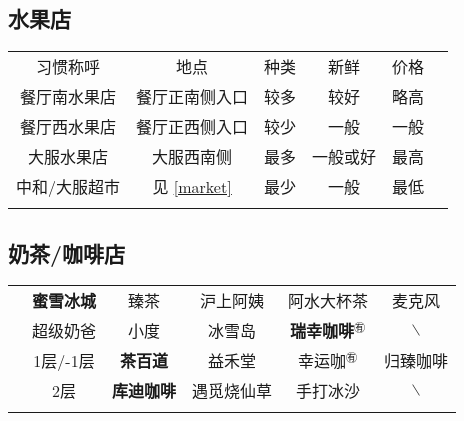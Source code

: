 \subsection[水果店]{水果店}
\begin{table}[H]
    \centering
    \begin{tabular}{|c|c|c|c|c|c|}
        \Xhline{1.2pt}
        习惯称呼    & 地点                     & 种类 & 新鲜   & 价格 \\
        \Xhline{1.2pt}
        餐厅南水果店  & 餐厅正南侧入口                & 较多 & 较好   & 略高 \\
        \hline
        餐厅西水果店  & 餐厅正西侧入口                & 较少 & 一般   & 一般 \\
        \hline
        大服水果店   & 大服西南侧                  & 最多 & 一般或好 & 最高 \\
        \hline
        中和/大服超市 & 见 \uline{\ref{market}} & 最少 & 一般   & 最低 \\
        \Xhline{1.2pt}
    \end{tabular}
\end{table}

\subsection[奶茶/咖啡店]{奶茶/咖啡店}
\begin{table}[H]
    \centering
    \begin{tabular}{|c|c|c|c|c|c|}
        \Xhline{1.2pt}
        \multirow{2}{*}{食堂} & \textbf{蜜雪冰城}       & 臻茶            & 沪上阿姨  %
                            & 阿水大杯茶               & 麦克风                   \\
        \cline{2-6}
                            & 超级奶爸                & 小度            & 冰雪岛   %
                            & \textbf{瑞幸咖啡}$^{㊒}$ & $\backslash$          \\
        \Xhline{1.2pt}
        \multirow{2}{*}{大服} & 1层/-1层              & \textbf{茶百道}  & 益禾堂   %
                            & 幸运咖$^{㊒}$           & 归臻咖啡                  \\
        \cline{2-6}
                            & 2层                  & \textbf{库迪咖啡} & 遇觅烧仙草 %
                            & 手打冰沙                & $\backslash$          \\
        \Xhline{1.2pt}
    \end{tabular}
\end{table}

